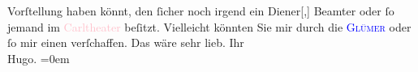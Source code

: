                Vorſtellung haben könnt, den ſicher noch irgend ein Diener{[},{]}
               Beamter oder ſo jemand im \textcolor{pink}{Carltheater}{}\ledrightnote{\textcolor{pink}{Carl-Theater}} beſitzt.
               Vielleicht könnten Sie mir durch die \textcolor{blue}{\textsc{Glümer}}{}\ledrightnote{\textcolor{blue}{Marie Glümer}} oder ſo mir einen verſchaffen. Das wäre sehr lieb.\pend
           \pstart
           Ihr{\\[\baselineskip]}\spacefill\mbox{Hugo.}\pend
           \leftskip=0em{}\endnumbering{}  
      